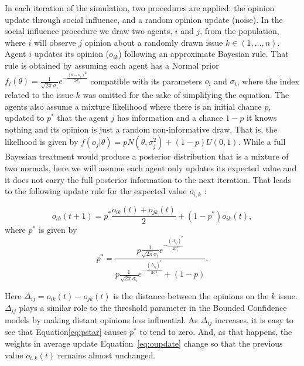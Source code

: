 \documentclass{article}
\begin{document}
In each iteration of the simulation, two procedures are applied: the
opinion update through social influence, and a random opinion update (noise). In
the social influence procedure we draw two agents, \(i\) and \(j\), from the
population, where \(i\) will observe \(j\) opinion about a randomly drawn issue \(k
\in (1 , \ldots, n)\). %
Agent \(i\) updates its opinion (\(o_{ik}\)) following an approximate Bayesian
rule. That rule is obtained by assuming each agent has a Normal prior
\(f_i(\theta) = \frac{1}{\sqrt{2 \pi} \sigma_i} e^{- \frac{(\theta - o_i )^2}{2
    \sigma_i}} \) compatible with its parameters $o_{i}$ and $\sigma_{i}$, where
the index related to the issue $k$ was omitted for the sake of simplifying the
equation. The agents also assume a mixture likelihood where there is an initial
chance \(p\), updated to \(p^*\) that the agent \(j\) has information and a
chance \(1-p\) it knows nothing and its opinion is just a random non-informative
draw. That is, the likelhood is given by \( f(o_j|\theta) = p
N(\theta,\sigma_j^2) + (1-p)U(0,1) \). While a full Bayesian treatment would
produce a posterior distribution that is a mixture of two normals, here we will
assume each agent only updates its expected value and it does not carry the full
posterior information to the next iteration. That leads to the following update
rule for the expected value $o_{i,k}$ \cite{martins2009bayesian}:


  \begin{equation}\label{eq:oupdate}
    o_{ik}(t+1) =
    p^{*}
    \frac{o_{ik}(t) + o_{jk}(t) }{2}
    +
    (1 - p^{*})
    o_{ik}(t),
  \end{equation}
where  $p^{*}$ is given by
  \begin{equation}\label{eq:pstar}
   p^{*}
    =
  \frac{
      p \frac{1}{\sqrt{2 \pi} \sigma_i}
      e^{- \frac{ (\Delta_{ij})^2}{2 \sigma_i^2}}
    }{
      p
      \frac{1}{\sqrt{2 \pi} \sigma_i}
    e^{- \frac{ ( \Delta_{ij})^2}{2 \sigma_i^2}}
    +
    (1 - p)
  }.
\end{equation}

Here \(\Delta_{ij} = o_{ik} (t) - o_{jk} (t)\) is the distance between the
opinions on the $k$ issue. $\Delta_{ij}$ plays a similar role to the threshold
parameter in the Bounded Confidence models by making distant opinions less
influential. As $\Delta_{ij}$ increases, it is easy to see that
Equation\ref{eq:pstar} causes $p^{*}$ to tend to zero. And, as that happens, the
weights in average update Equation~\ref{eq:oupdate} change so that the previous
value $ o_{i,k}(t)$ remains almost unchanged.
\end{document}
